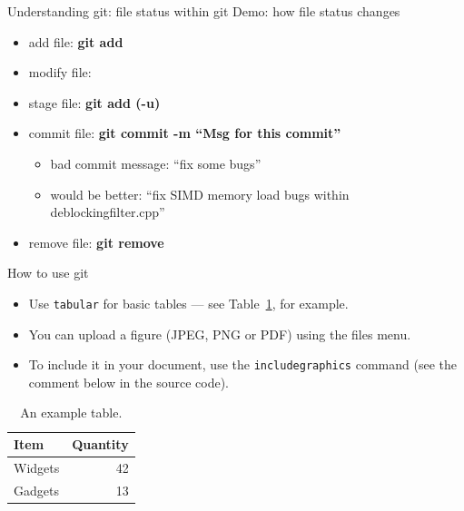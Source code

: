 \documentclass{beamer}
\begin{document}
\begin{frame}{Understanding git: file status within git}
    Demo: how file status changes
    \begin{itemize}
     \item    add file: \textbf{git add          }
     \item modify file: \textbf{                 }
     \item  stage file: \textbf{git add (-u)     }
     \item commit file: \textbf{git commit -m ``Msg for this commit''}
     \begin{itemize}
        \item bad commit message: ``fix some bugs''
        \item would be better: ``fix SIMD memory load bugs within deblockingfilter.cpp''
     \end{itemize}
     \item remove file: \textbf{git remove       }
    \end{itemize}
\end{frame}

\begin{frame}{How to use git}
\begin{itemize}
\item Use \texttt{tabular} for basic tables --- see Table~\ref{tab:widgets}, for example.
\item You can upload a figure (JPEG, PNG or PDF) using the files menu. 
\item To include it in your document, use the \texttt{includegraphics} command (see the comment below in the source code).
\end{itemize}


\begin{table}
\centering
\begin{tabular}{l|r}
Item & Quantity \\\hline
Widgets & 42 \\
Gadgets & 13
\end{tabular}
\caption{\label{tab:widgets}An example table.}
\end{table}

\end{frame}
\end{document}
